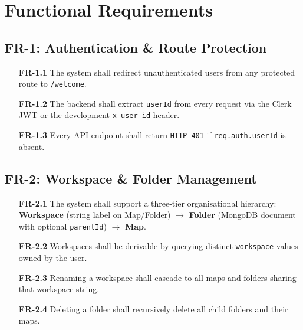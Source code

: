 \documentclass[12pt, a4paper]{article}
\begin{document}
\section{Functional Requirements}

\subsection{FR-1: Authentication \& Route Protection}
\begin{infobox}
\begin{itemize}[noitemsep, leftmargin=1.8cm]
  \item[\textbf{FR-1.1}] The system shall redirect unauthenticated users from any protected route to \texttt{/welcome}.
  \item[\textbf{FR-1.2}] The backend shall extract \texttt{userId} from every request via the Clerk JWT or the development \texttt{x-user-id} header.
  \item[\textbf{FR-1.3}] Every API endpoint shall return \texttt{HTTP 401} if \texttt{req.auth.userId} is absent.
\end{itemize}
\end{infobox}

\subsection{FR-2: Workspace \& Folder Management}
\begin{itemize}[noitemsep, leftmargin=1.8cm]
  \item[\textbf{FR-2.1}] The system shall support a three-tier organisational hierarchy: \textbf{Workspace} (string label on Map/Folder) $\rightarrow$ \textbf{Folder} (MongoDB document with optional \texttt{parentId}) $\rightarrow$ \textbf{Map}.
  \item[\textbf{FR-2.2}] Workspaces shall be derivable by querying distinct \texttt{workspace} values owned by the user.
  \item[\textbf{FR-2.3}] Renaming a workspace shall cascade to all maps and folders sharing that workspace string.
  \item[\textbf{FR-2.4}] Deleting a folder shall recursively delete all child folders and their maps.
\end{itemize}
\end{document}
